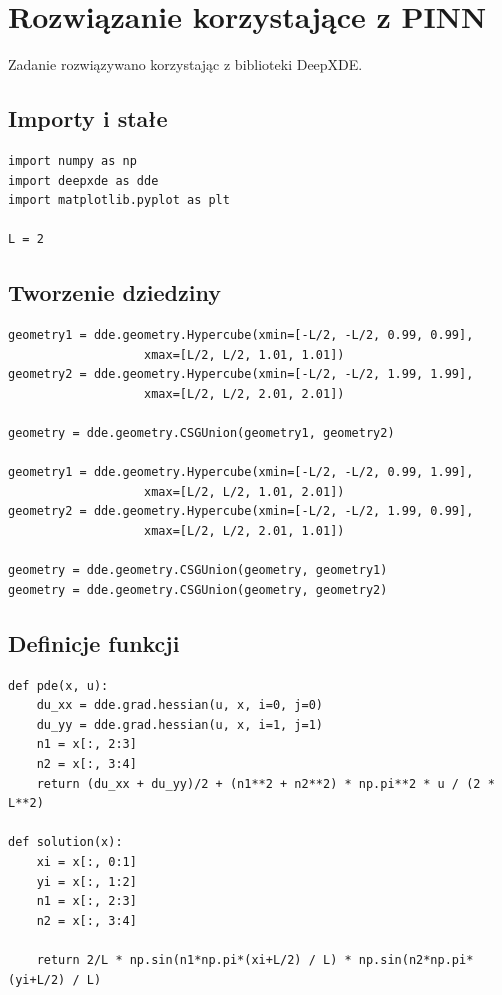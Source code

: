 \documentclass{article}
\begin{document}
	\newpage

	\section*{Rozwiązanie korzystające z PINN}

	Zadanie rozwiązywano korzystając z biblioteki DeepXDE. 

	\subsection*{Importy i stałe}

	\begin{lstlisting}
import numpy as np
import deepxde as dde
import matplotlib.pyplot as plt

L = 2
	\end{lstlisting}

	\subsection*{Tworzenie dziedziny}

	\begin{lstlisting}
geometry1 = dde.geometry.Hypercube(xmin=[-L/2, -L/2, 0.99, 0.99], 
				   xmax=[L/2, L/2, 1.01, 1.01])
geometry2 = dde.geometry.Hypercube(xmin=[-L/2, -L/2, 1.99, 1.99], 
				   xmax=[L/2, L/2, 2.01, 2.01])

geometry = dde.geometry.CSGUnion(geometry1, geometry2)

geometry1 = dde.geometry.Hypercube(xmin=[-L/2, -L/2, 0.99, 1.99], 
				   xmax=[L/2, L/2, 1.01, 2.01])
geometry2 = dde.geometry.Hypercube(xmin=[-L/2, -L/2, 1.99, 0.99], 
				   xmax=[L/2, L/2, 2.01, 1.01])

geometry = dde.geometry.CSGUnion(geometry, geometry1)
geometry = dde.geometry.CSGUnion(geometry, geometry2)
	\end{lstlisting}

	\newpage

	\subsection*{Definicje funkcji}

	\begin{lstlisting}
def pde(x, u):
    du_xx = dde.grad.hessian(u, x, i=0, j=0)
    du_yy = dde.grad.hessian(u, x, i=1, j=1)
    n1 = x[:, 2:3]
    n2 = x[:, 3:4]
    return (du_xx + du_yy)/2 + (n1**2 + n2**2) * np.pi**2 * u / (2 * L**2)

def solution(x):
    xi = x[:, 0:1]
    yi = x[:, 1:2]
    n1 = x[:, 2:3]
    n2 = x[:, 3:4]
    
    return 2/L * np.sin(n1*np.pi*(xi+L/2) / L) * np.sin(n2*np.pi*(yi+L/2) / L)
	\end{lstlisting}
\end{document}
